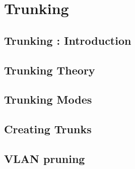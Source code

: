 \chapter{Trunking}

\section{Trunking : Introduction}


\section{Trunking Theory}


\section{Trunking Modes}


\section{Creating Trunks}


\section{VLAN pruning}



